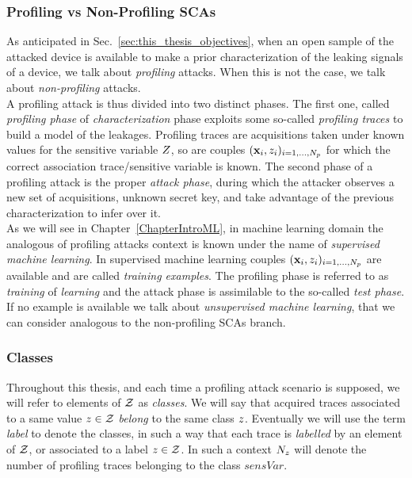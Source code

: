 \subsubsection{Profiling vs Non-Profiling SCAs}
As anticipated in Sec.~\ref{sec:this_thesis_objectives}, when an open sample of the attacked device is available to make a prior characterization of the leaking signals of a device, we talk about \emph{profiling} attacks. When this is not the case, we talk about \emph{non-profiling} attacks. \\
A profiling attack is thus divided into two distinct phases. The first one, called \emph{profiling phase} of \emph{characterization} phase exploits some so-called \emph{profiling traces} to build a model of the leakages. Profiling traces are acquisitions taken under known values for the sensitive variable $Z$, so are couples $(\textbf{x}_i, z_i)_{i=1, \dots , N_p}$ for which the correct association trace/sensitive variable is known. The second phase of a profiling attack is the proper \emph{attack phase}, during which the attacker observes a new set of acquisitions, unknown secret key, and take advantage of the previous characterization to infer over it. \\
As we will see in Chapter~\ref{ChapterIntroML}, in machine learning domain the analogous of profiling attacks context is known under the name of \emph{supervised machine learning}. In supervised machine learning couples $(\textbf{x}_i, z_i)_{i=1, \dots , N_p}$ are available and are called \emph{training examples}. The profiling phase is referred to as \emph{training} of \emph{learning} and the attack phase is assimilable to the so-called \emph{test phase}. If no example is available we talk about \emph{unsupervised machine learning}, that we can consider analogous to the non-profiling SCAs branch. 

\subsubsection{Classes}
Throughout this thesis, and each time a profiling attack scenario is supposed,  we will refer to elements of $\mathcal{Z}$ as \emph{classes}. We will say that acquired traces associated to a same value $z\in\mathcal{Z}$ \emph{belong} to the same class $z$. Eventually we will use the term \emph{label} to denote the classes, in such a way that each trace is \emph{labelled} by an element of $\mathcal{Z}$, or associated to a label $z\in\mathcal{Z}$. In such a context $N_{z}$ will denote the number of profiling traces belonging to the class $sensVar$.

